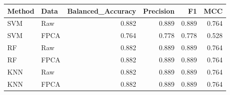 
\begin{tabular}{llrrrr}
\toprule
Method & Data & Balanced\_Accuracy & Precision & F1 & MCC\\
\midrule
SVM & Raw & 0.882 & 0.889 & 0.889 & 0.764\\
SVM & FPCA & 0.764 & 0.778 & 0.778 & 0.528\\
RF & Raw & 0.882 & 0.889 & 0.889 & 0.764\\
RF & FPCA & 0.882 & 0.889 & 0.889 & 0.764\\
KNN & Raw & 0.882 & 0.889 & 0.889 & 0.764\\
\addlinespace
KNN & FPCA & 0.882 & 0.889 & 0.889 & 0.764\\
\bottomrule
\end{tabular}
